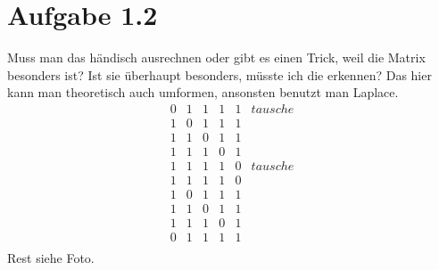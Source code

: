 \documentclass{article} %
\begin{document}
\section{Aufgabe 1.2}
Muss man das händisch ausrechnen oder gibt es einen Trick, weil die Matrix besonders ist? Ist sie überhaupt besonders, müsste ich die erkennen? Das hier kann man theoretisch auch umformen, ansonsten benutzt man Laplace. \\
\begin{equation*}
\begin{array}{ccccc|c}
      0 & 1 & 1 & 1 & 1 & tausche \\ 
    1 & 0 & 1 & 1 & 1 \\
    1 & 1 & 0 & 1 & 1 \\
    1 & 1 & 1 & 0 & 1 \\
    1 & 1 & 1 & 1 & 0  & tausche \\ \hline
    1 & 1 & 1 & 1 & 0 \\
    1 & 0 & 1 & 1 & 1 \\
    1 & 1 & 0 & 1 & 1 \\
    1 & 1 & 1 & 0 & 1 \\
     0 & 1 & 1 & 1 & 1 \\
\end{array}
\end{equation*}
Rest siehe Foto. 
  
\end{document}
